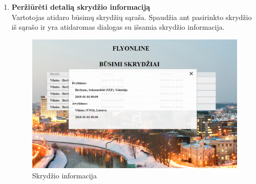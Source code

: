 \documentclass{VUMIFPSkursinis}
\begin{document}
\begin{enumerate}[label=\textbf{U\arabic*}.]
                    \item \textbf{Peržiūrėti detalią skrydžio informaciją}\\
                    Vartotojas atidaro būsimų skrydžių sąraša. Spaudžia ant pasirinkto skrydžio iš sąrašo ir yra atidaromas dialogas su išsamia skrydžio informacija.
                    \begin{figure}[H]	
                        \centering
                        \includegraphics[scale=0.4]{img/details}	
                        \caption{Skrydžio informacija}	
                        \label{Skrydžio informacija}	
                    \end{figure}
                    
                \end{enumerate}
      
\end{document}
